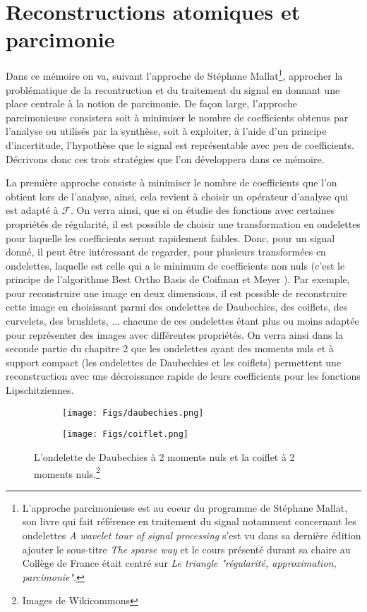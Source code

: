 \section{Reconstructions atomiques et parcimonie}
Dans ce mémoire on va, suivant l'approche de Stéphane Mallat\footnote{L'approche parcimonieuse est au coeur du programme de Stéphane Mallat, son livre qui fait référence en traitement du signal notamment concernant les ondelettes \emph{A wavelet tour of signal processing} s'est vu dans sa dernière édition ajouter le sous-titre \emph{The sparse way} et le cours présenté durant sa chaire au Collège de France était centré sur \emph{Le triangle "régularité, approximation, parcimonie"}.},
approcher la problématique de la recontruction et du traitement du signal en donnant une place centrale à la notion de parcimonie.
De façon large, l'approche parcimonieuse consistera soit à minimiser le nombre de coefficients obtenus par l'analyse ou utilisés par la synthèse, soit à exploiter, à l'aide d'un principe d'incertitude, l'hypothèse que le signal est représentable avec peu de coefficients.
Décrivons donc ces trois stratégies que l'on développera dans ce mémoire.
\newline

La première approche consiste à minimiser le nombre de coefficients que l'on obtient lors de l'analyse, ainsi, cela revient à choisir un opérateur d'analyse qui est adapté à $\mathcal{F}$.
On verra ainsi, que si on étudie des fonctions avec certaines propriétés de régularité, il est possible de choisir une transformation en ondelettes pour laquelle les coefficients seront rapidement faibles. 
Donc, pour un signal donné, il peut être intéressant de regarder, pour plusieurs transformées en ondelettes, laquelle est celle qui a le minimum de coefficients non nuls (c'est le principe de l'algorithme Best Ortho Basis de Coifman et Meyer \cite{coifortho}).
Par exemple, pour reconstruire une image en deux dimensions, il est possible de reconstruire cette image en choisissant parmi des ondelettes de Daubechies, des coiflets, des curvelets, des brushlets, ...
chacune de ces ondelettes étant plus ou moins adaptée pour représenter des images avec différentes propriétés.
On verra ainsi dans la seconde partie du chapitre 2 que les ondelettes ayant des moments nuls et à support compact (les ondelettes de Daubechies et les coiflets) permettent une reconstruction avec une décroissance rapide de leurs coefficients pour les fonctions Lipschitziennes.

\begin{figure}[h]%
\centering
\begin{subfigure}{.5\textwidth}
  \centering
  \texttt{[image: Figs/daubechies.png]}
  \label{fig:sub1}
\end{subfigure}%
\begin{subfigure}{.5\textwidth}
  \centering
  \texttt{[image: Figs/coiflet.png]}
  \label{fig:sub2}
\end{subfigure}
	\caption{L'ondelette de Daubechies à 2 moments nuls et la coiflet à 2 moments nuls.\footnote{Images de Wikicommons}}
\label{fig:test}
\end{figure}

